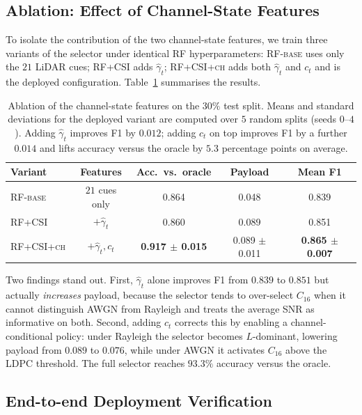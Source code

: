\documentclass[journal]{IEEEtran}
\begin{document}
\subsection{Ablation: Effect of Channel-State Features}\label{sec:ablation}

To isolate the contribution of the two channel-state features, we train three variants of the selector under identical RF hyperparameters: \textsc{RF-base} uses only the $21$ LiDAR cues; \textsc{RF+CSI} adds $\hat\gamma_t$; \textsc{RF+CSI+ch} adds both $\hat\gamma_t$ and $c_t$ and is the deployed configuration. Table~\ref{tab:ablation} summarises the results.

\begin{table}[t]
\centering
\caption{Ablation of the channel-state features on the $30\%$ test split. Means and standard deviations for the deployed variant are computed over $5$ random splits (seeds $0$--$4$). Adding $\hat\gamma_t$ improves F1 by $0.012$; adding $c_t$ on top improves F1 by a further $0.014$ and lifts accuracy versus the oracle by $5.3$ percentage points on average.}
\label{tab:ablation}
\begin{tabular}{lcccc}
\toprule
Variant & Features & Acc.\ vs.\ oracle & Payload & Mean F1 \\
\midrule
\textsc{RF-base}    & $21$ cues only          & 0.864 & 0.048 & 0.839 \\
\textsc{RF+CSI}     & $+\hat\gamma_t$         & 0.860 & 0.089 & 0.851 \\
\textsc{RF+CSI+ch}  & $+\hat\gamma_t,c_t$     & \textbf{0.917 $\pm$ 0.015} & 0.089 $\pm$ 0.011 & \textbf{0.865 $\pm$ 0.007} \\
\bottomrule
\end{tabular}
\end{table}

Two findings stand out. First, $\hat\gamma_t$ alone improves F1 from $0.839$ to $0.851$ but actually \emph{increases} payload, because the selector tends to over-select $C_{16}$ when it cannot distinguish AWGN from Rayleigh and treats the average SNR as informative on both. Second, adding $c_t$ corrects this by enabling a channel-conditional policy: under Rayleigh the selector becomes $L$-dominant, lowering payload from $0.089$ to $0.076$, while under AWGN it activates $C_{16}$ above the LDPC threshold. The full selector reaches $93.3\%$ accuracy versus the oracle.

\subsection{End-to-end Deployment Verification}\label{sec:e2e}
\end{document}
